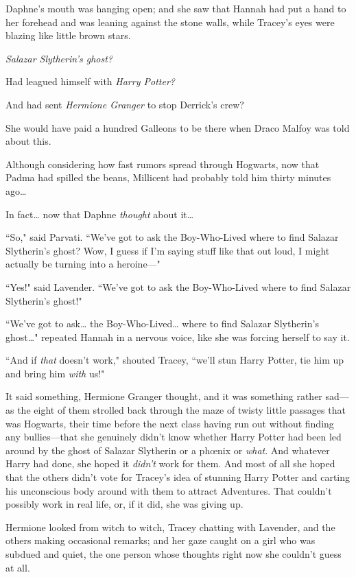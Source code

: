 Daphne's mouth was hanging open; and she saw that Hannah had put a hand to her forehead and was leaning against the stone walls, while Tracey's eyes were blazing like little brown stars.

\emph{Salazar Slytherin's ghost?}

Had leagued himself with \emph{Harry Potter?}

And had sent \emph{Hermione Granger} to stop Derrick's crew?

She would have paid a hundred Galleons to be there when Draco Malfoy was told about this.

Although considering how fast rumors spread through Hogwarts, now that Padma had spilled the beans, Millicent had probably told him thirty minutes ago{\ldots}

In fact{\ldots} now that Daphne \emph{thought} about it{\ldots}

``So," said Parvati. ``We've got to ask the Boy-Who-Lived where to find Salazar Slytherin's ghost? Wow, I guess if I'm saying stuff like that out loud, I might actually be turning into a heroine—"

``Yes!" said Lavender. ``We've got to ask the Boy-Who-Lived where to find Salazar Slytherin's ghost!"

``We've got to ask{\ldots} the Boy-Who-Lived{\ldots} where to find Salazar Slytherin's ghost{\ldots}" repeated Hannah in a nervous voice, like she was forcing herself to say it.

``And if \emph{that} doesn't work," shouted Tracey, ``we'll stun Harry Potter, tie him up and bring him \emph{with} us!"

\later

It said something, Hermione Granger thought, and it was something rather sad—as the eight of them strolled back through the maze of twisty little passages that was Hogwarts, their time before the next class having run out without finding any bullies—that she genuinely didn't know whether Harry Potter had been led around by the ghost of Salazar Slytherin or a phœnix or \emph{what}. And whatever Harry had done, she hoped it \emph{didn't} work for them. And most of all she hoped that the others didn't vote for Tracey's idea of stunning Harry Potter and carting his unconscious body around with them to attract Adventures. That couldn't possibly work in real life, or, if it did, she was giving up.

Hermione looked from witch to witch, Tracey chatting with Lavender, and the others making occasional remarks; and her gaze caught on a girl who was subdued and quiet, the one person whose thoughts right now she couldn't guess at all.

